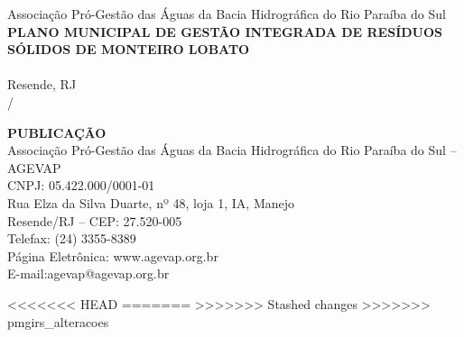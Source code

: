 \pagebreak

\pagestyle{headimage}

\begin{center}
	\vspace{2em}
	Associação Pró-Gestão das Águas da Bacia Hidrográfica do Rio Paraíba do Sul\\
	\vspace{10cm}
	\textbf{{\Large PLANO MUNICIPAL DE GESTÃO INTEGRADA DE RESÍDUOS SÓLIDOS DE MONTEIRO LOBATO}\\}
	\vspace{2em}
	\textbf{{\Large \nomeProduto}}\\
	\vfill
	{\Large Resende, RJ\\
	\mes / \ano}
\end{center}

\pagebreak

\vspace*{\fill}%
\raggedright
{\textbf{PUBLICAÇÃO\\}
\vspace{2em}
Associação Pró-Gestão das Águas da Bacia Hidrográfica do Rio Paraíba do Sul – AGEVAP\\
CNPJ: 05.422.000/0001-01\\
Rua Elza da Silva Duarte, nº 48, loja 1, IA, Manejo\\
Resende/RJ – CEP: 27.520-005\\
Telefax: (24) 3355-8389\\
Página Eletrônica: www.agevap.org.br\\
E-mail:agevap@agevap.org.br}

<<<<<<< HEAD
=======
>>>>>>> Stashed changes
>>>>>>> pmgirs_alteracoes
\pagebreak

\clearpage